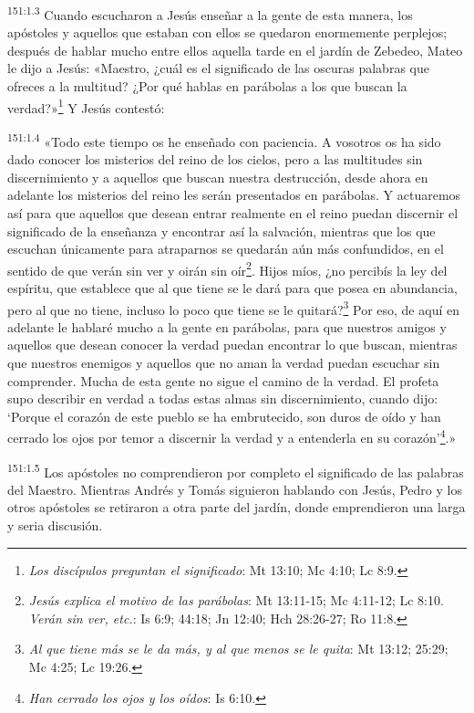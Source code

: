 \par
\textsuperscript{151:1.3} Cuando escucharon a Jesús enseñar a la gente de esta manera, los apóstoles y aquellos que estaban con ellos se quedaron enormemente perplejos; después de hablar mucho entre ellos aquella tarde en el jardín de Zebedeo, Mateo le dijo a Jesús: «Maestro, ¿cuál es el significado de las oscuras palabras que ofreces a la multitud? ¿Por qué hablas en parábolas a los que buscan la verdad?»\footnote{\textit{Los discípulos preguntan el significado}: Mt 13:10; Mc 4:10; Lc 8:9.} Y Jesús contestó:

\par
\textsuperscript{151:1.4} «Todo este tiempo os he enseñado con paciencia. A vosotros os ha sido dado conocer los misterios del reino de los cielos, pero a las multitudes sin discernimiento y a aquellos que buscan nuestra destrucción, desde ahora en adelante los misterios del reino les serán presentados en parábolas. Y actuaremos así para que aquellos que desean entrar realmente en el reino puedan discernir el significado de la enseñanza y encontrar así la salvación, mientras que los que escuchan únicamente para atraparnos se quedarán aún más confundidos, en el sentido de que verán sin ver y oirán sin oír\footnote{\textit{Jesús explica el motivo de las parábolas}: Mt 13:11-15; Mc 4:11-12; Lc 8:10. \textit{Verán sin ver, etc.}: Is 6:9; 44:18; Jn 12:40; Hch 28:26-27; Ro 11:8.}. Hijos míos, ¿no percibís la ley del espíritu, que establece que al que tiene se le dará para que posea en abundancia, pero al que no tiene, incluso lo poco que tiene se le quitará?\footnote{\textit{Al que tiene más se le da más, y al que menos se le quita}: Mt 13:12; 25:29; Mc 4:25; Lc 19:26.} Por eso, de aquí en adelante le hablaré mucho a la gente en parábolas, para que nuestros amigos y aquellos que desean conocer la verdad puedan encontrar lo que buscan, mientras que nuestros enemigos y aquellos que no aman la verdad puedan escuchar sin comprender. Mucha de esta gente no sigue el camino de la verdad. El profeta supo describir en verdad a todas estas almas sin discernimiento, cuando dijo: `Porque el corazón de este pueblo se ha embrutecido, son duros de oído y han cerrado los ojos por temor a discernir la verdad y a entenderla en su corazón'\footnote{\textit{Han cerrado los ojos y los oídos}: Is 6:10.}.»

\par
\textsuperscript{151:1.5} Los apóstoles no comprendieron por completo el significado de las palabras del Maestro. Mientras Andrés y Tomás siguieron hablando con Jesús, Pedro y los otros apóstoles se retiraron a otra parte del jardín, donde emprendieron una larga y seria discusión.

